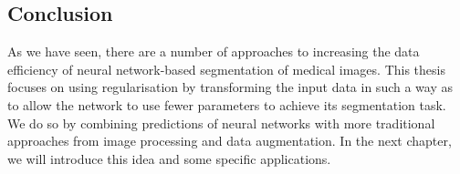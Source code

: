 \subsection{Conclusion}

As we have seen, there are a number of approaches to increasing the data efficiency of neural network-based segmentation of medical images. This thesis focuses on using regularisation by transforming the input data in such a way as to allow the network to use fewer parameters to achieve its segmentation task. We do so by combining predictions of neural networks with more traditional approaches from image processing and data augmentation. In the next chapter, we will introduce this idea and some specific applications.

%	
%
%
%	
	

